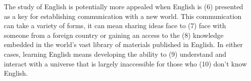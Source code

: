 \documentclass[UTF8,11pt]{ctexart}
\begin{document}
The study of English is potentially more appealed when English is (6) presented as a key for establishing communication with a new world. This communication can take a variety of forms, it can mean sharing ideas face to (7) face with someone from a foreign country or gaining an access to the (8) knowledge embedded in the world’s vast library of materials published in English. In either cases, learning English means developing the ability to (9) understand and interact with a universe that is largely inaccessible for those who (10) don’t know English.
\end{document}
